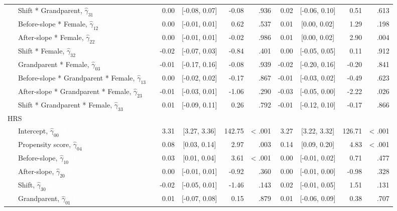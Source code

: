 \documentclass[
  english,
  man, noextraspace,floatsintext]{apa7}
\newenvironment{lltable}{\begin{landscape}\begin{center}\begin{ThreePartTable}}{\end{ThreePartTable}\end{center}\end{landscape}}
\begin{document}
\begin{appendix}
\begin{lltable}
{\begin{longtable}{lrcrrrcrr}
\ \ \ Shift * Grandparent, $\hat{\gamma}_{31}$ \textcolor{white}{L} & 0.00 & {}[-0.08, 0.07] & -0.08 & .936 & 0.02 & {}[-0.06, 0.10] & 0.51 & .613\\
\ \ \ Before-slope * Female, $\hat{\gamma}_{12}$ \textcolor{white}{L} & 0.00 & {}[-0.01, 0.01] & 0.62 & .537 & 0.01 & {}[0.00, 0.02] & 1.29 & .198\\
\ \ \ After-slope * Female, $\hat{\gamma}_{22}$ \textcolor{white}{L} & 0.00 & {}[-0.01, 0.01] & -0.02 & .986 & 0.01 & {}[0.00, 0.02] & 2.90 & .004\\
\ \ \ Shift * Female, $\hat{\gamma}_{32}$ \textcolor{white}{L} & -0.02 & {}[-0.07, 0.03] & -0.84 & .401 & 0.00 & {}[-0.05, 0.05] & 0.11 & .912\\
\ \ \ Grandparent * Female, $\hat{\gamma}_{03}$ \textcolor{white}{L} & -0.01 & {}[-0.17, 0.16] & -0.08 & .939 & -0.02 & {}[-0.20, 0.16] & -0.20 & .841\\
\ \ \ Before-slope * Grandparent * Female, $\hat{\gamma}_{13}$ \textcolor{white}{L} & 0.00 & {}[-0.02, 0.02] & -0.17 & .867 & -0.01 & {}[-0.03, 0.02] & -0.49 & .623\\
\ \ \ After-slope * Grandparent * Female, $\hat{\gamma}_{23}$ \textcolor{white}{L} & -0.01 & {}[-0.03, 0.01] & -1.06 & .290 & -0.03 & {}[-0.05, 0.00] & -2.22 & .026\\
\ \ \ Shift * Grandparent * Female, $\hat{\gamma}_{33}$ \textcolor{white}{L} & 0.01 & {}[-0.09, 0.11] & 0.26 & .792 & -0.01 & {}[-0.12, 0.10] & -0.17 & .866\\
HRS &  &  &  &  &  &  &  & \\
\ \ \ Intercept, $\hat{\gamma}_{00}$ \textcolor{white}{H} & 3.31 & {}[3.27, 3.36] & 142.75 & < .001 & 3.27 & {}[3.22, 3.32] & 126.71 & < .001\\
\ \ \ Propensity score, $\hat{\gamma}_{04}$ \textcolor{white}{H} & 0.08 & {}[0.03, 0.14] & 2.97 & .003 & 0.14 & {}[0.09, 0.20] & 4.83 & < .001\\
\ \ \ Before-slope, $\hat{\gamma}_{10}$ \textcolor{white}{H} & 0.03 & {}[0.01, 0.04] & 3.61 & < .001 & 0.00 & {}[-0.01, 0.02] & 0.71 & .477\\
\ \ \ After-slope, $\hat{\gamma}_{20}$ \textcolor{white}{H} & 0.00 & {}[-0.01, 0.01] & -0.92 & .360 & 0.00 & {}[-0.01, 0.00] & -0.98 & .328\\
\ \ \ Shift, $\hat{\gamma}_{30}$ \textcolor{white}{H} & -0.02 & {}[-0.05, 0.01] & -1.46 & .143 & 0.02 & {}[-0.01, 0.05] & 1.51 & .131\\
\ \ \ Grandparent, $\hat{\gamma}_{01}$ \textcolor{white}{H} & 0.01 & {}[-0.07, 0.08] & 0.15 & .879 & 0.01 & {}[-0.06, 0.09] & 0.38 & .707\\

\end{longtable}}
\end{lltable}
\end{appendix}
\end{document}
